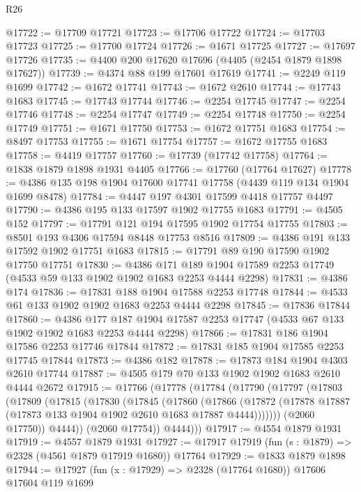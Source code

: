 \begin{lexlean}{R26}
\begin{coremodule}
@17722 := @17709 @17721
@17723 := @17706 @17722
@17724 := @17703 @17723
@17725 := @17700 @17724
@17726 := @1671 @17725
@17727 := @17697 @17726
@17735 := @4400 @200 @17620 @17696 (@4405 (@2454 @1879 @1898 @17627))
@17739 := @4374 @88 @199 @17601 @17619
@17741 := @2249 @119 @1699
@17742 := @1672 @17741
@17743 := @1672 @2610
@17744 := @17743 @1683
@17745 := @17743 @17744
@17746 := @2254 @17745
@17747 := @2254 @17746
@17748 := @2254 @17747
@17749 := @2254 @17748
@17750 := @2254 @17749
@17751 := @1671 @17750
@17753 := @1672 @17751 @1683
@17754 := @8497 @17753
@17755 := @1671 @17754
@17757 := @1672 @17755 @1683
@17758 := @4419 @17757
@17760 := @17739 (@17742 @17758)
@17764 := @1838 @1879 @1898 @1931 @4405
@17766 := @17760 (@17764 @17627)
@17778 := @4386 @135 @198 @1904 @17600 @17741 @17758 (@4439 @119 @134 @1904 @1699 @8478)
@17784 := @4447 @197 @4301 @17599 @4418 @17757 @4497
@17790 := @4386 @195 @133 @17597 @1902 @17755 @1683
@17791 := @4505 @152
@17797 := @17791 @121 @194 @17595 @1902 @17754 @17755
@17803 := @8501 @193 @4306 @17594 @8448 @17753 @8516
@17809 := @4386 @191 @133 @17592 @1902 @17751 @1683
@17815 := @17791 @89 @190 @17590 @1902 @17750 @17751
@17830 := @4386
    @171
    @189
    @1904
    @17589
    @2253
    @17749
    (@4533 @59 @133 @1902 @1902 @1683 @2253 @4444 @2298)
@17831 := @4386 @174
@17836 := @17831 @188 @1904 @17588 @2253 @17748
@17844 := @4533 @61 @133 @1902 @1902 @1683 @2253 @4444 @2298
@17845 := @17836 @17844
@17860 := @4386
    @177
    @187
    @1904
    @17587
    @2253
    @17747
    (@4533 @67 @133 @1902 @1902 @1683 @2253 @4444 @2298)
@17866 := @17831 @186 @1904 @17586 @2253 @17746 @17844
@17872 := @17831 @185 @1904 @17585 @2253 @17745 @17844
@17873 := @4386 @182
@17878 := @17873 @184 @1904 @4303 @2610 @17744
@17887 := @4505 @179 @70 @133 @1902 @1902 @1683 @2610 @4444 @2672
@17915 := @17766
    (@17778
      (@17784
        (@17790
          (@17797
            (@17803
              (@17809
                (@17815
                  (@17830
                    (@17845
                      (@17860
                        (@17866
                          (@17872
                            (@17878 @17887 (@17873 @133 @1904 @1902 @2610 @1683 @17887 @4444)))))))
                  (@2060 @17750))
                @4444))
            (@2060 @17754))
          @4444)))
@17917 := @4554 @1879 @1931
@17919 := @4557 @1879 @1931
@17927 := @17917 @17919 (fun (s : @1879) => @2328 (@4561 @1879 @17919 @1680)) @17764
@17929 := @1833 @1879 @1898
@17944 := @17927
    (fun (x : @17929) => @2328 (@17764 @1680))
    @17606
    @17604
    @119
    @1699

\end{coremodule}
\end{lexlean}
